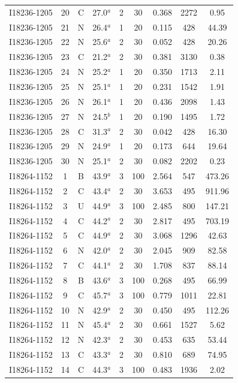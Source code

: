 \begin{table}
\begin{tabular}{ccccccccc}
I18236-1205 & 20 & C & 27.0$^{a}$ & 2 & 30 & 0.368 & 2272 & 0.95 \\
I18236-1205 & 21 & N & 26.4$^{a}$ & 1 & 20 & 0.115 & 428 & 44.39 \\
I18236-1205 & 22 & N & 25.6$^{a}$ & 2 & 30 & 0.052 & 428 & 20.26 \\
I18236-1205 & 23 & C & 21.2$^{a}$ & 2 & 30 & 0.381 & 3130 & 0.38 \\
I18236-1205 & 24 & N & 25.2$^{a}$ & 1 & 20 & 0.350 & 1713 & 2.11 \\
I18236-1205 & 25 & N & 25.1$^{a}$ & 1 & 20 & 0.231 & 1542 & 1.91 \\
I18236-1205 & 26 & N & 26.1$^{a}$ & 1 & 20 & 0.436 & 2098 & 1.43 \\
I18236-1205 & 27 & N & 24.5$^{b}$ & 1 & 20 & 0.190 & 1495 & 1.72 \\
I18236-1205 & 28 & C & 31.3$^{a}$ & 2 & 30 & 0.042 & 428 & 16.30 \\
I18236-1205 & 29 & N & 24.9$^{a}$ & 1 & 20 & 0.173 & 644 & 19.64 \\
I18236-1205 & 30 & N & 25.1$^{a}$ & 2 & 30 & 0.082 & 2202 & 0.23 \\
I18264-1152 & 1 & B & 43.9$^{a}$ & 3 & 100 & 2.564 & 547 & 473.26 \\
I18264-1152 & 2 & C & 43.4$^{a}$ & 2 & 30 & 3.653 & 495 & 911.96 \\
I18264-1152 & 3 & U & 44.9$^{a}$ & 3 & 100 & 2.485 & 800 & 147.21 \\
I18264-1152 & 4 & C & 44.2$^{a}$ & 2 & 30 & 2.817 & 495 & 703.19 \\
I18264-1152 & 5 & C & 44.9$^{a}$ & 2 & 30 & 3.068 & 1296 & 42.63 \\
I18264-1152 & 6 & N & 42.0$^{a}$ & 2 & 30 & 2.045 & 909 & 82.58 \\
I18264-1152 & 7 & C & 44.1$^{a}$ & 2 & 30 & 1.708 & 837 & 88.14 \\
I18264-1152 & 8 & B & 43.6$^{a}$ & 3 & 100 & 0.268 & 495 & 66.99 \\
I18264-1152 & 9 & C & 45.7$^{a}$ & 3 & 100 & 0.779 & 1011 & 22.81 \\
I18264-1152 & 10 & N & 42.9$^{a}$ & 2 & 30 & 0.450 & 495 & 112.26 \\
I18264-1152 & 11 & N & 45.4$^{a}$ & 2 & 30 & 0.661 & 1527 & 5.62 \\
I18264-1152 & 12 & N & 42.3$^{a}$ & 2 & 30 & 0.453 & 635 & 53.44 \\
I18264-1152 & 13 & C & 43.3$^{a}$ & 2 & 30 & 0.810 & 689 & 74.95 \\
I18264-1152 & 14 & C & 44.3$^{a}$ & 3 & 100 & 0.483 & 1936 & 2.02 \\

\end{tabular}
\end{table}
